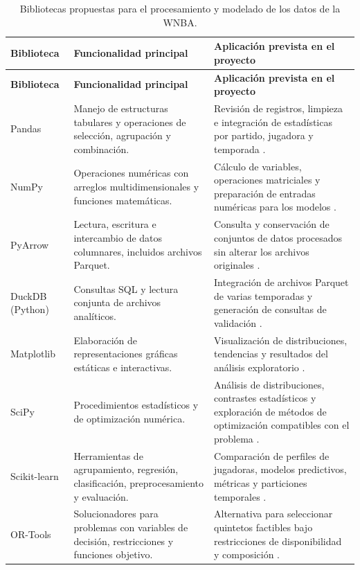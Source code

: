 \begin{longtable}{@{}p{2.45cm}p{4.0cm}p{5.95cm}@{}}
\caption{Bibliotecas propuestas para el procesamiento y modelado de los datos de la WNBA.}
\label{tab:bibliotecas_tt}\\
\toprule
\textbf{Biblioteca} & \textbf{Funcionalidad principal} & \textbf{Aplicación prevista en el proyecto}\\
\midrule
\endfirsthead
\toprule
\textbf{Biblioteca} & \textbf{Funcionalidad principal} & \textbf{Aplicación prevista en el proyecto}\\
\midrule
\endhead
Pandas & Manejo de estructuras tabulares y operaciones de selección, agrupación y combinación. & Revisión de registros, limpieza e integración de estadísticas por partido, jugadora y temporada \cite{pandasDocsOficial}.\\
\addlinespace
NumPy & Operaciones numéricas con arreglos multidimensionales y funciones matemáticas. & Cálculo de variables, operaciones matriciales y preparación de entradas numéricas para los modelos \cite{numpyDocsOficial}.\\
\addlinespace
PyArrow & Lectura, escritura e intercambio de datos columnares, incluidos archivos Parquet. & Consulta y conservación de conjuntos de datos procesados sin alterar los archivos originales \cite{pyarrowDocsOficial}.\\
\addlinespace
DuckDB (Python) & Consultas SQL y lectura conjunta de archivos analíticos. & Integración de archivos Parquet de varias temporadas y generación de consultas de validación \cite{duckdbParquetOficial}.\\
\addlinespace
Matplotlib & Elaboración de representaciones gráficas estáticas e interactivas. & Visualización de distribuciones, tendencias y resultados del análisis exploratorio \cite{matplotlibDocsOficial}.\\
\addlinespace
SciPy & Procedimientos estadísticos y de optimización numérica. & Análisis de distribuciones, contrastes estadísticos y exploración de métodos de optimización compatibles con el problema \cite{scipyStatsOficial,scipyOptimizeOficial}.\\
\addlinespace
Scikit-learn & Herramientas de agrupamiento, regresión, clasificación, preprocesamiento y evaluación. & Comparación de perfiles de jugadoras, modelos predictivos, métricas y particiones temporales \cite{sklearnGuiaOficial}.\\
\addlinespace
OR-Tools & Solucionadores para problemas con variables de decisión, restricciones y funciones objetivo. & Alternativa para seleccionar quintetos factibles bajo restricciones de disponibilidad y composición \cite{ortoolsDocsOficial}.\\
\bottomrule
\end{longtable}

